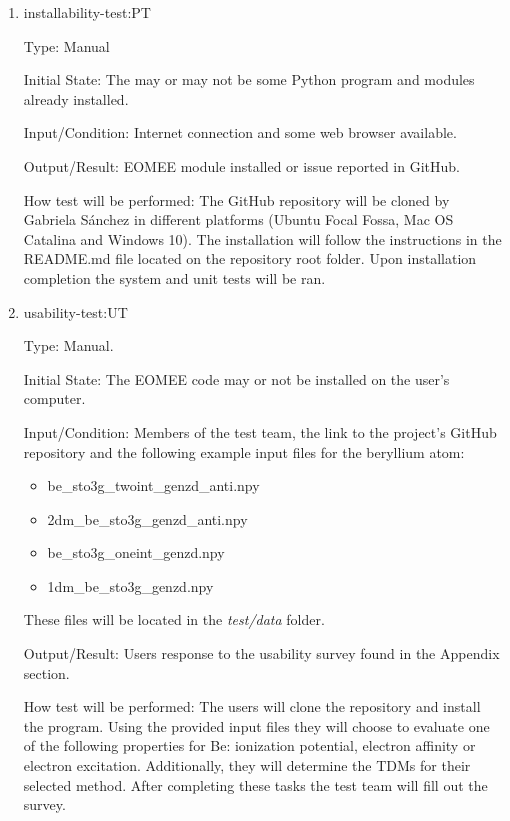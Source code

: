 \documentclass[12pt, titlepage]{article}
\begin{document}
\begin{enumerate}
	
	\item{installability-test:PT}
	
	Type: Manual
	
	Initial State: The may or may not be some Python program and modules 
	already installed.
	
	Input/Condition: Internet connection and some web browser available.
	
	Output/Result: EOMEE module installed or issue reported in GitHub.
	
	How test will be performed: 
	The GitHub repository will be cloned by Gabriela S\'anchez in different 
	platforms (Ubuntu Focal 
	Fossa, Mac OS Catalina and Windows 10). The installation will follow the 
	instructions in the README.md file located on the repository root folder. 
	Upon installation completion the system and unit tests will be ran. 

	\item{usability-test:UT\\}
	\label{sec:usability}
	
	Type: Manual.
	
	Initial State: The EOMEE code may or not be installed on the user's 
	computer.
	
	Input/Condition: Members of the test team, the link to the project's GitHub 
	repository and the following example input files for the beryllium atom:
	\begin{itemize}
		\item be\_sto3g\_twoint\_genzd\_anti.npy
		\item 2dm\_be\_sto3g\_genzd\_anti.npy
		\item be\_sto3g\_oneint\_genzd.npy
		\item 1dm\_be\_sto3g\_genzd.npy
	\end{itemize}
	These files will be located in the \textit{test/data} folder.
	
	Output/Result: Users response to the usability survey found in the Appendix 
	section.
	
	How test will be performed: The users will clone the repository and install 
	the program. Using the provided input files they will choose to evaluate 
	one of the following properties for Be: ionization potential, electron 
	affinity or electron excitation. Additionally, they will determine the TDMs 
	for their selected method. After completing these tasks the test team will 
	fill out the survey.
	
	
\end{enumerate}
\end{document}
